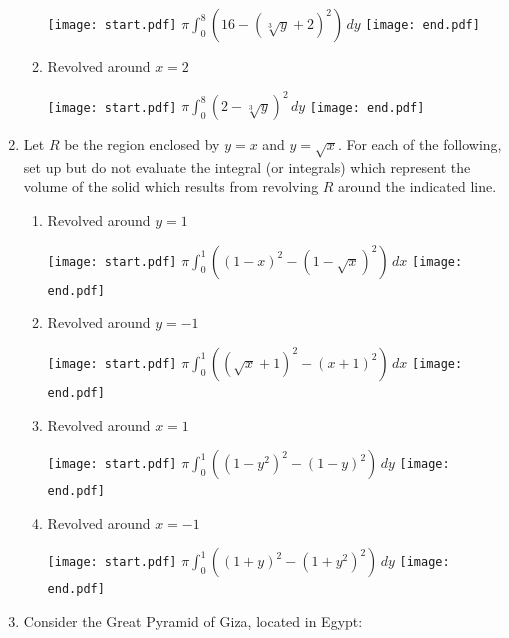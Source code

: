 \documentclass[12pt]{article}
\begin{document}
\begin{enumerate}
\begin{enumerate}
\texttt{[image: start.pdf]}
{{$\pi \int_0^8 \left(16-(\sqrt[3]{y}+2)^2\right)\,dy$}}
\texttt{[image: end.pdf]}


\item Revolved around $x=2$

\texttt{[image: start.pdf]}
{{$\pi \int_0^8 (2-\sqrt[3]{y})^2 \,dy$}}
\texttt{[image: end.pdf]}


\end{enumerate}

\item Let $R$ be the region enclosed by $y=x$ and $y=\sqrt{x}$.  For each of the following, set up but do not evaluate the integral (or integrals) which represent the volume of the solid which results from revolving $R$ around the indicated line.

\begin{enumerate}

\item Revolved around $y=1$

\texttt{[image: start.pdf]}
{{$\pi \int_0^1 \left((1-x)^2-(1-\sqrt{x})^2\right)\,dx$}}
\texttt{[image: end.pdf]}


\item Revolved around $y=-1$

\texttt{[image: start.pdf]}
{{$\pi \int_0^1 \left((\sqrt{x}+1)^2-(x+1)^2\right)\,dx$}}
\texttt{[image: end.pdf]}


\item Revolved around $x=1$

\texttt{[image: start.pdf]}
{{$\pi \int_0^1 \left((1-y^2)^2-(1-y)^2\right)\,dy$}}
\texttt{[image: end.pdf]}


\item Revolved around $x=-1$

\texttt{[image: start.pdf]}
{{$\pi \int_0^1 \left((1+y)^2-(1+y^2)^2\right)\,dy$}}
\texttt{[image: end.pdf]}


\end{enumerate}

\newpage

\item Consider the Great Pyramid of Giza, located in Egypt:


\end{enumerate}
\end{document}
